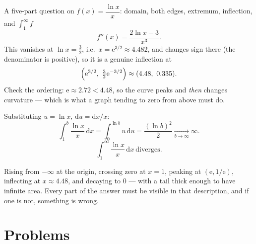 \begin{worked}{A five-part question on $f(x)=\dfrac{\ln x}{x}$: domain, both edges, extremum, inflection, and $\int_{1}^{\infty}f$}
\[
  f''(x)=\frac{2\ln x-3}{x^{3}} .
\]
This vanishes at $\ln x=\tfrac32$, i.e.\ $x=\mathrm{e}^{3/2}\approx4.482$,
and changes sign there (the denominator is positive), so it is a genuine
inflection at
\[
  \Bigl(\mathrm{e}^{3/2},\ \tfrac{3}{2}\mathrm{e}^{-3/2}\Bigr)\approx(4.48,\ 0.335).
\]
Check the ordering: $\mathrm{e}\approx2.72<4.48$, so the curve peaks and
\emph{then} changes curvature --- which is what a graph tending to zero from
above must do.

Substituting $u=\ln x$, $\mathrm{d}u=\mathrm{d}x/x$:
\[
  \int_{1}^{b}\frac{\ln x}{x}\,\mathrm{d}x
  =\int_{0}^{\ln b}u\,\mathrm{d}u
  =\frac{(\ln b)^{2}}{2}\xrightarrow[b\to\infty]{}\infty .
\]
\[
  \boxed{\int_{1}^{\infty}\frac{\ln x}{x}\,\mathrm{d}x\ \text{diverges.}}
\]

Rising from $-\infty$ at the origin, crossing zero at $x=1$, peaking at
$(\mathrm{e},1/\mathrm{e})$, inflecting at $x\approx4.48$, and decaying to
$0$ --- with a tail thick enough to have infinite area. Every part of the
answer must be visible in that description, and if one is not, something is
wrong.
\begin{center}
\end{center}
\end{worked}

\section{Problems}

